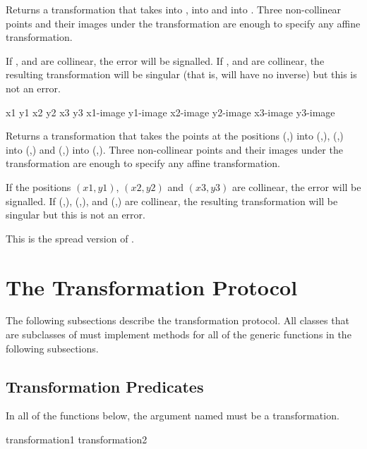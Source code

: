 Returns a transformation that takes  into
,  into  and 
into .  Three non-collinear points and their images under the
transformation are enough to specify any affine transformation.

If ,  and  are collinear, the
 error will be signalled.  If
,  and  are collinear,
the resulting transformation will be singular (that is, will have no inverse)
but this is not an error.


 {x1 y1 x2 y2 x3 y3 x1-image y1-image x2-image y2-image x3-image y3-image}

Returns a transformation that takes the points at the positions
(,) into (,), (,)
into (,) and (,) into
(,).  Three non-collinear points and their images
under the transformation are enough to specify any affine transformation.

If the positions $(x1,y1)$, $(x2,y2)$ and $(x3,y3)$ are collinear, the
 error will be signalled.  If
(,), (,), and
(,) are collinear, the resulting transformation will
be singular but this is not an error.

This is the spread version of .


\section {The Transformation Protocol}

The following subsections describe the transformation protocol.  All classes
that are subclasses of  must implement methods for all of
the generic functions in the following subsections.


\subsection {Transformation Predicates}

In all of the functions below, the argument named  must be a
transformation.

 {transformation1 transformation2} 

